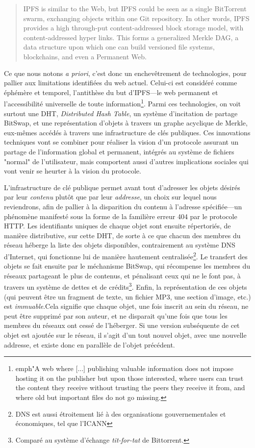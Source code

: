 \documentclass{article}
\begin{document}
\begin{quote}
    IPFS is similar to the Web, but IPFS could be seen as a single BitTorrent swarm, exchanging objects within one Git repository. In other words, IPFS provides a high through-put content-addressed block storage model, with content-addressed hyper links. This forms a generalized Merkle DAG, a data structure upon which one can build versioned file systems, blockchains, and even a Permanent Web.
\end{quote}

Ce que nous notons \emph{a priori}, c'est donc un enchevêtrement de technologies, pour pallier aux limitations identifiées du web actuel. Celui-ci est considéré comme éphémère et temporel, l'antithèse du but d'IPFS—le web permanent et l'accessibilité universelle de toute information\footnote{emph{"A web where [...] publishing valuable information does not impose hosting it on the publisher but upon those interested, where users can trust the content they receive without trusting the peers they receive it from, and where old but important files do not go missing.}\cite{benet_ipfs_2014}}. Parmi ces technologies, on voit surtout une DHT, \emph{Distributed Hash Table}, un système d'incitation de partage BitSwap, et une représentation d'objets à travers un graphe acyclique de Merkle, eux-mêmes accédés à travers une infrastructure de clés publiques. Ces innovations techniques vont se combiner pour réaliser la vision d'un protocole assurant un partage de l'information global et permanent, intégrés au système de fichiers "normal" de l'utilisateur, mais comportent aussi d'autres implications sociales qui vont venir se heurter à la vision du protocole.

L'infrastructure de clé publique permet avant tout d'adresser les objets désirés par leur \emph{contenu} plutôt que par leur \emph{addresse}, un choix sur lequel nous reviendrons, afin de pallier à la disparition du contenu à l'adresse spécifiée—un phénomène manifesté sous la forme de la familière erreur 404 par le protocole HTTP. Les identifiants uniques de chaque objet sont ensuite répertoriés, de manière distributive, sur cette DHT, de sorte à ce que chacun des membres du réseau héberge la liste des objets disponibles, contrairement au système DNS d'Internet, qui fonctionne lui de manière hautement centralisée\footnote{DNS est aussi étroitement lié à des organisations gouvernementales et économiques, tel que l'ICANN}. Le transfert des objets se fait ensuite par le méchanisme BitSwap, qui récompense les membres du réseaux partageant le plus de contenus, et pénalisant ceux qui ne le font pas, à travers un système de dettes et de crédits\footnote{Comparé au système d'échange \emph{tit-for-tat} de Bittorrent.}. Enfin, la représentation de ces objets (qui peuvent être un fragment de texte, un fichier MP3, une section d'image, etc.) est \emph{immuable}.Cela signifie que chaque objet, une fois inscrit au sein du réseau, ne peut être supprimé par son auteur, et ne disparait qu'une fois que tous les membres du réseaux ont cessé de l'héberger. Si une version subséquente de cet objet est ajoutée sur le réseau, il s'agit d'un tout nouvel objet, avec une nouvelle addresse, et existe donc en parallèle de l'objet précédent.
\end{document}
